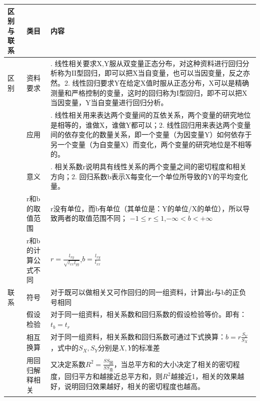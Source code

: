 \documentclass[
  letterpaper,
  DIV=11,
  numbers=noendperiod]{scrartcl}
\begin{document}
\begin{longtable}[]{@{}
  >{\centering\arraybackslash}p{}
  >{\centering\arraybackslash}p{}
  >{\raggedright\arraybackslash}p{}@{}}
\toprule\noalign{}
\begin{minipage}[b]{\linewidth}\centering
区别与联系
\end{minipage} & \begin{minipage}[b]{\linewidth}\centering
类目
\end{minipage} & \begin{minipage}[b]{\linewidth}\raggedright
内容
\end{minipage} \\
\midrule\noalign{}
\endhead
\bottomrule\noalign{}
\endlastfoot
区别 & 资料要求 & 1.
线性相关要求X,Y服从双变量正态分布，对这种资料进行回归分析称为\(\textrm{II}\)型回归，即可以把X当自变量，也可以当因变量，反之亦然。2.
线性回归要求Y在给定X值时服从正态分布，X可以是精确测量和严格控制的变量，这时的回归称为\textrm{I}型回归，即不可以把X当因变量，Y当自变量进行回归分析。 \\
& 应用 & 1.
线性相关用来表达两个变量间的互依关系，两个变量的研究地位是相等的，谁做X，谁做Y都可以；2.
线性回归用来表达两个变量间的依存变化的数量关系，即一个变量（为因变量Y）如何依存于另一个变量（为自变量X）而变化，两个变量的研究地位是不相等的。 \\
& 意义 & 1.
相关系数r说明具有线性关系的两个变量之间的密切程度和相关方向；2.
回归系数b表示X每变化一个单位所导致的Y的平均变化量。 \\
& r和b的取值范围 &
r没有单位，而b有单位（其单位是：Y的单位/X的单位），所以导致两者的取值范围不同；
\(-1 \le r \le 1\),\(-\infty<b<+\infty\) \\
& r和b的计算公式不同 &
\(r=\frac{l_{xy}}{\sqrt{l_{xx}l_{yy}}}\),\(b=\frac{l_{xy}}{l_{xx}}\) \\
联系 & 符号 &
对于既可以做相关又可作回归的同一组资料，计算出r与b的正负号相同 \\
& 假设检验 &
对于同一组资料，相关系数和回归系数的假设检验等价。即有：\(t_b=t_r\) \\
& 相互换算 &
对于同一组资料，相关系数和回归系数可通过下式换算：\(b=r\frac{S_Y}{S_X}\)，式中的\(S_X,S_Y\)分别是\(X,Y\)的标准差 \\
& 用回归解释相关 &
又决定系数\(R^2=\frac{SS_{回}}{SS_{总}}\)，当总平方和的大小决定了相关的密切程度，回归平方和越接近总平方和，则\(R^2\)越接近1，相关的效果越好，说明回归效果越好，相关的密切程度也越高。 \\
\end{longtable}
\end{document}
